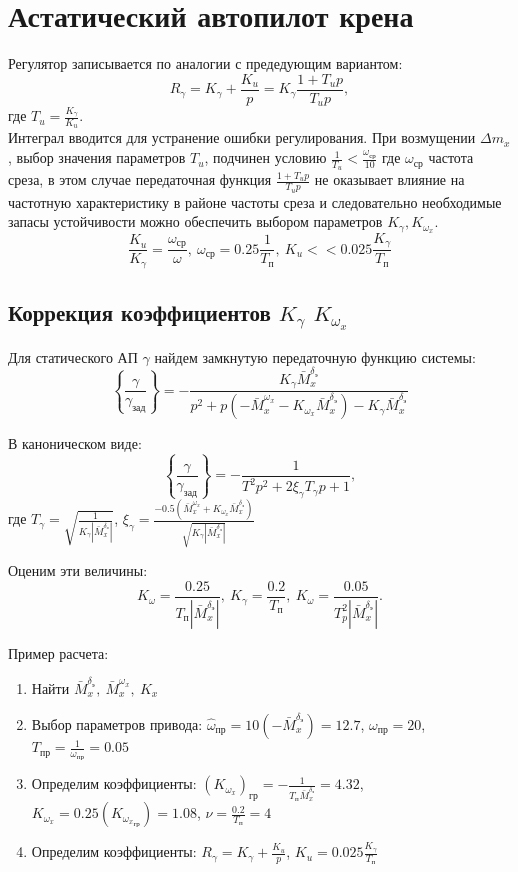 \documentclass{article}
\begin{document}
\section{Астатический автопилот крена}
Регулятор записывается по аналогии с предедующим вариантом:
\[
	R_\gamma = K_\gamma +\frac{K_u}{p}  = K_\gamma\frac{1 + T_u p}{T_u p},
\]
где $T_u  = \frac{K_\gamma}{K_u}$.\\
Интеграл вводится для устранение ошибки регулирования. При возмущении $\Delta m_x$, выбор значения параметров $T_u$, подчинен условию $\frac{1}{T_u} < \frac{\omega_\text{ср}}{10}$ где $\omega_\text{ср}$ частота среза, в этом случае передаточная функция $\frac{1 + T_u p}{T_u p}$ не оказывает влияние на частотную характеристику в районе частоты среза и следовательно необходимые запасы устойчивости можно обеспечить выбором параметров $K_\gamma, K_{\omega_x}$.
\[
	\frac{K_u}{K_\gamma} =\frac{\omega_\text{ср}}{\omega}, \ \omega_\text{ср} = 0.25\frac{1}{T_\text{п}}, \ K_u << 0.025\frac{K_\gamma}{T_\text{п}}
\]
\subsection{Коррекция коэффициентов \texorpdfstring{$K_\gamma$}{Lg} \texorpdfstring{$K_{\omega_x}$}{Lg}}
Для статического АП $\gamma$ найдем замкнутую передаточную функцию системы:
\[
	\left\{\frac{\gamma}{\gamma_\text{зад}}\right\} = -\frac{K_\gamma \bar{M}_x^{\delta_\text{э}}}{p^2 + p(-\bar{M}_x^{\omega_x} - K_{\omega_x} \bar{M}_x^{\delta_\text{э}}) - K_{\gamma} \bar{M}_x^{\delta_\text{э}}} 
\]

В каноническом виде:
\[
	\left\{\frac{\gamma}{\gamma_\text{зад}}\right\} = -\frac{1}{T^2 p^2 + 2\xi_{\gamma} T_{\gamma} p + 1},
\]
где $T_\gamma = \sqrt{\frac{1}{K_\gamma |\bar{M}_x^{\delta_\text{э}}|}}$, $\xi_{\gamma} = \frac{-0.5(\bar{M}_x^{\omega_x} + K_{\omega_x} \bar{M}_x^{\delta_\text{э}})}{\sqrt{K_\gamma |\bar{M}_x^{\delta_\text{э}}|}}$

Оценим эти величины:
\[
	K_\omega =\frac{0.25}{T_\text{п}|\bar{M}_x^{\delta_\text{э}}|},\ K_\gamma = \frac{0.2}{T_\text{п}},\ K_\omega =\frac{0.05}{T_p^2 |\bar{M}_x^{\delta_\text{э}}|}.
\]

Пример расчета:
\begin{enumerate}
	\item Найти $\bar{M}_x ^{\delta_\text{э}},\ \bar{M}_x^{\omega_x},\ K_x$
	\item Выбор параметров привода:
	      $\hat{\omega}_\text{пр} = 10(-\bar{M}_x^{\delta_\text{э}}) =  12.7$, $\omega_\text{пр} = 20$, $T_\text{пр} = \frac{1}{\omega_\text{пр}} = 0.05$
	\item Определим коэффициенты:
	      $(K_{\omega_x})_\text{гр} = -\frac{1}{T_\text{п} \bar{M}_x^{\delta_\text{э}}}=4.32$, $K_{\omega_x} = 0.25 (K_{{\omega_x}_\text{гр}}) = 1.08$, $\nu =\frac{0.2}{T_\text{п}}=4$
	\item Определим коэффициенты: $R_\gamma = K_\gamma +\frac{K_u}{p}$, $K_u = 0.025 \frac{K_\gamma}{T_\text{п}}$
\end{enumerate}
\end{document}
